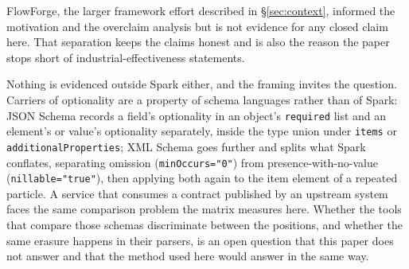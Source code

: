 FlowForge, the larger framework effort described in \S\ref{sec:context}, informed the motivation and the overclaim analysis but is not evidence for any closed claim here. That separation keeps the claims honest and is also the reason the paper stops short of industrial-effectiveness statements.

\label{sec:beyond-spark}
Nothing is evidenced outside Spark either, and the framing invites the question. Carriers of optionality are a property of schema languages rather than of Spark: JSON Schema records a field's optionality in an object's \texttt{required} list and an element's or value's optionality separately, inside the type union under \texttt{items} or \texttt{additionalProperties}; XML Schema goes further and splits what Spark conflates, separating omission (\texttt{minOccurs="0"}) from presence-with-no-value (\texttt{nillable="true"}), then applying both again to the item element of a repeated particle. A service that consumes a contract published by an upstream system faces the same comparison problem the matrix measures here. Whether the tools that compare those schemas discriminate between the positions, and whether the same erasure happens in their parsers, is an open question that this paper does not answer and that the method used here would answer in the same way.

